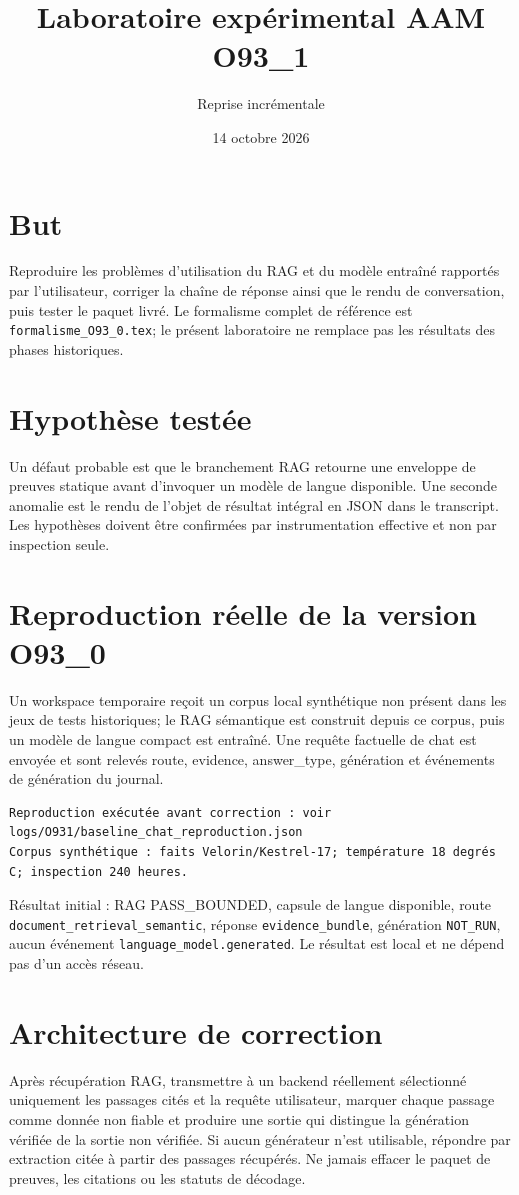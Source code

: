 \documentclass[11pt,a4paper]{article}
\title{Laboratoire expérimental AAM O93\_1}\author{Reprise incrémentale}\date{14 octobre 2026}
\begin{document}
\maketitle
\section{But}
Reproduire les problèmes d'utilisation du RAG et du modèle entraîné rapportés par l'utilisateur, corriger la chaîne de réponse ainsi que le rendu de conversation, puis tester le paquet livré. Le formalisme complet de référence est \texttt{formalisme\_O93\_0.tex}; le présent laboratoire ne remplace pas les résultats des phases historiques.
\section{Hypothèse testée}
Un défaut probable est que le branchement RAG retourne une enveloppe de preuves statique avant d'invoquer un modèle de langue disponible. Une seconde anomalie est le rendu de l'objet de résultat intégral en JSON dans le transcript. Les hypothèses doivent être confirmées par instrumentation effective et non par inspection seule.
\section{Reproduction réelle de la version O93\_0}
Un workspace temporaire reçoit un corpus local synthétique non présent dans les jeux de tests historiques; le RAG sémantique est construit depuis ce corpus, puis un modèle de langue compact est entraîné. Une requête factuelle de chat est envoyée et sont relevés route, evidence, answer\_type, génération et événements de génération du journal.
\begin{verbatim}
Reproduction exécutée avant correction : voir logs/O931/baseline_chat_reproduction.json
Corpus synthétique : faits Velorin/Kestrel-17; température 18 degrés C; inspection 240 heures.
\end{verbatim}
Résultat initial : RAG PASS\_BOUNDED, capsule de langue disponible, route \texttt{document\_retrieval\_semantic}, réponse \texttt{evidence\_bundle}, génération \texttt{NOT\_RUN}, aucun événement \texttt{language\_model.generated}. Le résultat est local et ne dépend pas d'un accès réseau.
\section{Architecture de correction}
Après récupération RAG, transmettre à un backend réellement sélectionné uniquement les passages cités et la requête utilisateur, marquer chaque passage comme donnée non fiable et produire une sortie qui distingue la génération vérifiée de la sortie non vérifiée. Si aucun générateur n'est utilisable, répondre par extraction citée à partir des passages récupérés. Ne jamais effacer le paquet de preuves, les citations ou les statuts de décodage.
\end{document}
